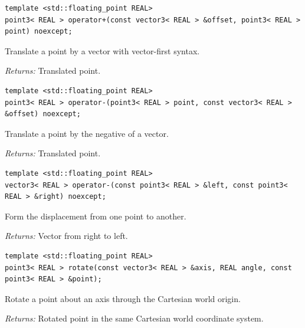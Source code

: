 \par\noindent\begin{minipage}{\linewidth}
\begin{lstlisting}[style=apireference]
template <std::floating_point REAL>
point3< REAL > operator+(const vector3< REAL > &offset, point3< REAL > point) noexcept;
\end{lstlisting}
{\footnotesize Translate a point by a vector with vector-first syntax.\par}
{\footnotesize\textit{Returns:} Translated point.\par}
\end{minipage}\par\vspace{1pt}
\par\noindent\begin{minipage}{\linewidth}
\begin{lstlisting}[style=apireference]
template <std::floating_point REAL>
point3< REAL > operator-(point3< REAL > point, const vector3< REAL > &offset) noexcept;
\end{lstlisting}
{\footnotesize Translate a point by the negative of a vector.\par}
{\footnotesize\textit{Returns:} Translated point.\par}
\end{minipage}\par\vspace{1pt}
\par\noindent\begin{minipage}{\linewidth}
\begin{lstlisting}[style=apireference]
template <std::floating_point REAL>
vector3< REAL > operator-(const point3< REAL > &left, const point3< REAL > &right) noexcept;
\end{lstlisting}
{\footnotesize Form the displacement from one point to another.\par}
{\footnotesize\textit{Returns:} Vector from right to left.\par}
\end{minipage}\par\vspace{1pt}
\par\noindent\begin{minipage}{\linewidth}
\begin{lstlisting}[style=apireference]
template <std::floating_point REAL>
point3< REAL > rotate(const vector3< REAL > &axis, REAL angle, const point3< REAL > &point);
\end{lstlisting}
{\footnotesize Rotate a point about an axis through the Cartesian world origin.\par}
{\footnotesize\textit{Returns:} Rotated point in the same Cartesian world coordinate system.\par}
\end{minipage}\par\vspace{1pt}
